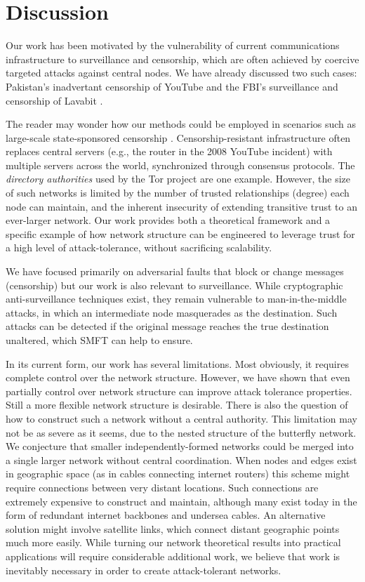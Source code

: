 \documentclass[10pt,letterpaper]{article}
\begin{document}
\section*{Discussion}
\label{sec-discussion}

Our work has been motivated by the vulnerability of current communications
infrastructure to surveillance and censorship,
which are often achieved by coercive targeted attacks against central nodes.
We have already discussed two such cases:
Pakistan's inadvertant censorship of YouTube
\cite{hunter_pakistan_2008}
and the FBI's surveillance and censorship of Lavabit
\cite{poulsen_edward_2013}.

The reader may wonder how our methods could be employed in scenarios
such as large-scale state-sponsored censorship
\cite{xu_internet_2011}.
Censorship-resistant infrastructure often replaces central servers
(e.g., the router in the 2008 YouTube incident) with multiple servers across
the world, synchronized through consensus protocols.
The {\em directory authorities} used by the Tor project
\cite{dingledine_tor:_2004} are one example.
However, the size of such networks is limited by the number of
trusted relationships (degree) each node can maintain, and the inherent insecurity of
extending transitive trust to an ever-larger network.
Our work provides both a theoretical framework
and a specific example of how network structure
can be engineered to leverage trust for a high level of attack-tolerance,
without sacrificing scalability.

We have focused primarily on adversarial faults that block or
change messages (censorship) but our work is also relevant to
surveillance.
While cryptographic anti-surveillance techniques exist,
they remain vulnerable to man-in-the-middle attacks,
in which an intermediate node masquerades as the destination.
Such attacks can be detected if the original message reaches the true
destination unaltered,
which SMFT can help to ensure.

In its current form, our work has several limitations.
Most obviously, it requires complete control over the network structure.
However, we have shown that even partially control over network structure can
improve attack tolerance properties.
Still a more flexible network structure is desirable.
There is also the question of how to construct such a network without a central
authority.
This limitation may not be as severe as it seems,
due to the nested structure of the butterfly network.
We conjecture that smaller independently-formed networks could be
merged into a single larger network without central coordination.
When nodes and edges exist in geographic space (as in cables connecting internet
routers) this scheme might require connections between very distant locations.
Such connections are extremely expensive to construct and maintain,
although many exist today in the form of redundant internet backbones and
undersea cables. An alternative solution might involve satellite links,
which connect distant geographic points much more easily.
While turning our network theoretical results into practical applications
will require considerable additional work, we believe that work is inevitably
necessary in order to create attack-tolerant networks.
\end{document}
